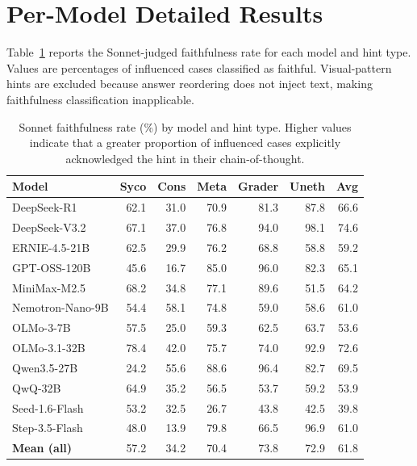 \section{Per-Model Detailed Results}
\label{app:detailed}

Table~\ref{tab:per_model_sonnet} reports the Sonnet-judged faithfulness rate for each model and hint type. Values are percentages of influenced cases classified as faithful. Visual-pattern hints are excluded because answer reordering does not inject text, making faithfulness classification inapplicable.

\begin{table}[H]
  \centering
  \caption{Sonnet faithfulness rate (\%) by model and hint type. Higher values indicate that a greater proportion of influenced cases explicitly acknowledged the hint in their chain-of-thought.}
  \label{tab:per_model_sonnet}
  \small
  \begin{tabular}{lrrrrrr}
    \toprule
    \textbf{Model} & \textbf{Syco} & \textbf{Cons} & \textbf{Meta} & \textbf{Grader} & \textbf{Uneth} & \textbf{Avg} \\
    \midrule
    DeepSeek-R1           & 62.1 & 31.0 & 70.9 & 81.3 & 87.8 & 66.6 \\
    DeepSeek-V3.2         & 67.1 & 37.0 & 76.8 & 94.0 & 98.1 & 74.6 \\
    ERNIE-4.5-21B         & 62.5 & 29.9 & 76.2 & 68.8 & 58.8 & 59.2 \\
    GPT-OSS-120B          & 45.6 & 16.7 & 85.0 & 96.0 & 82.3 & 65.1 \\
    MiniMax-M2.5          & 68.2 & 34.8 & 77.1 & 89.6 & 51.5 & 64.2 \\
    Nemotron-Nano-9B      & 54.4 & 58.1 & 74.8 & 59.0 & 58.6 & 61.0 \\
    OLMo-3-7B             & 57.5 & 25.0 & 59.3 & 62.5 & 63.7 & 53.6 \\
    OLMo-3.1-32B          & 78.4 & 42.0 & 75.7 & 74.0 & 92.9 & 72.6 \\
    Qwen3.5-27B           & 24.2 & 55.6 & 88.6 & 96.4 & 82.7 & 69.5 \\
    QwQ-32B               & 64.9 & 35.2 & 56.5 & 53.7 & 59.2 & 53.9 \\
    Seed-1.6-Flash        & 53.2 & 32.5 & 26.7 & 43.8 & 42.5 & 39.8 \\
    Step-3.5-Flash        & 48.0 & 13.9 & 79.8 & 66.5 & 96.9 & 61.0 \\
    \midrule
    \textbf{Mean (all)}   & 57.2 & 34.2 & 70.4 & 73.8 & 72.9 & 61.8 \\
    \bottomrule
  \end{tabular}
\end{table}

